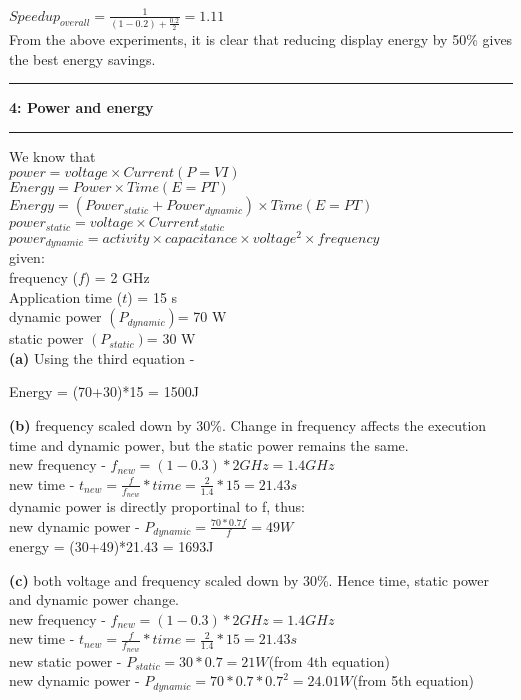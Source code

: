 \documentclass[11pt]{article}
\newcommand\question[2]{\vspace{.25in}\hrule\textbf{#1: #2}\vspace{.5em}\hrule\vspace{.10in}}
\renewcommand\part[1]{\vspace{.10in}\textbf{(#1)}}
\begin{document}
$Speedup_{overall}=\frac{1}{(1-0.2)+\frac{0.2}{2}}=1.11$\\

From the above experiments, it is clear that reducing display energy by 50\% gives the best energy savings.

\question{4}{Power and energy}
We know that\\
$power = voltage \times Current(P=VI)$\\
$Energy = Power \times Time(E=PT)$\\
$Energy = (Power_{static} + Power_{dynamic})\times Time(E=PT)$\\
$power_{static} = voltage \times Current_{static}$\\
$power_{dynamic} = activity \times capacitance \times voltage^2 \times frequency$\\

given:\\
frequency ($f$) = 2 GHz\\
Application time ($t$) = 15 s\\
dynamic power $(P_{dynamic})$= 70 W\\
static power $(P_{static})$= 30 W\\

\part{a}
Using the third equation -

Energy = (70+30)*15 = 1500J

\part{b}
frequency scaled down by 30\%. Change in frequency affects the execution time and dynamic power, but the static power remains the same.\\

new frequency - $f_{new} = (1-0.3)*2GHz = 1.4GHz$\\
new time  - $t_{new} = \frac{f}{f_{new}}*time = \frac{2}{1.4}*15 = 21.43s$\\
dynamic power is directly proportinal to f, thus:\\
new dynamic power - $P_{dynamic} = \frac{70*0.7f}{f} = 49 W $\\
energy = (30+49)*21.43 = 1693J

\part{c}
both voltage and frequency scaled down by 30\%. Hence time, static power and dynamic power change.\\
new frequency - $f_{new} = (1-0.3)*2GHz = 1.4GHz$\\
new time  - $t_{new} = \frac{f}{f_{new}}*time = \frac{2}{1.4}*15 = 21.43s$\\
new static power - $P_{static} = 30*0.7 = 21 W$(from 4th equation)\\
new dynamic power - $P_{dynamic} = 70 * 0.7 * 0.7^2 = 24.01 W$(from 5th equation)\\ 
\end{document}
